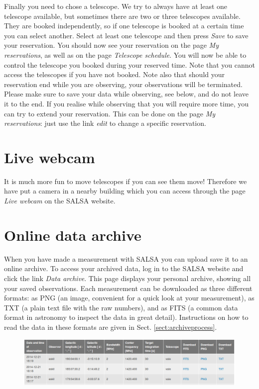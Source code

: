 Finally you need to chose a telescope. We try to always have at least one
telescope available, but sometimes there are two or three telescopes available.
They are booked independently, so if one telescope is booked at a certain time
you can select another.  Select at least one telescope and then press
\emph{Save} to save your reservation.  You should now see your reservation on
the page \emph{My reservations}, as well as on the page \emph{Telescope
schedule}. You will now be able to control the telescope you booked during your
reserved time. Note that you cannot access the telescopes if you have not
booked. Note also that should your reservation end while you are observing,
your observations will be terminated. Please make sure to save your data while
observing, see below, and do not leave it to the end. If you realise while
observing that you will require more time, you can try to extend your
reservation. This can be done on the page \emph{My reservations}: just use the
link \emph{edit} to change a specific reservation.

\section{Live webcam}
It is much more fun to move telescopes if you can see them move! Therefore
we have put a camera in a nearby building which you can access through the 
page \emph{Live webcam} on the SALSA website.

\section{Online data archive}
\label{sect:archive}
When you have made a measurement with SALSA you can upload save it to an online
archive. To access your archived data, log in to the SALSA website and click
the link \emph{Data archive}. This page displays your personal archive, showing
all your saved observations.  Each measurement can be downloaded as three
different formats: as PNG (an image, convenient for a quick look at your
measurement), as TXT (a plain text file with the raw numbers), and as FITS 
(a common data format in astronomy to inspect the data in great detail).
Instructions on how to read the data in these formats are given in Sect.
\ref{sect:archiveprocess}.
\begin{figure}[h]
\centering
\includegraphics[width=\textwidth]{../figures/SALSA_archive.png}
\end{figure}
